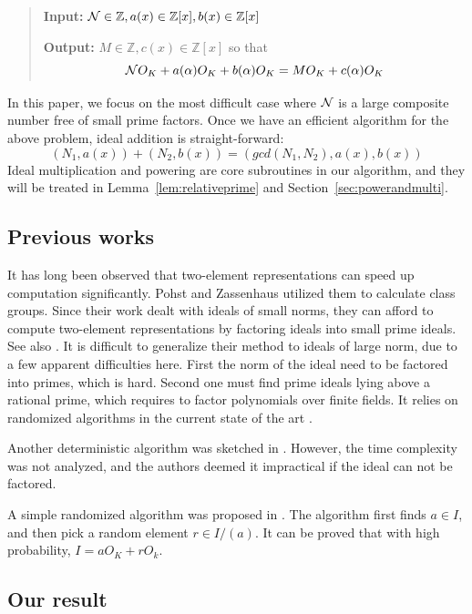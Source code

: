 \documentclass[runningheads, letter]{llncs}
\newcommand{\Z}{{\mathbb Z}}
\begin{document}
\begin{quote}
 {\bf Input:} \( {\cal N} \in \Z, a(x) \in \Z[x], b(x)  \in \Z[x]\)

 {\bf Output:} \( M \in \Z, c (x) \in \Z[x] \) so that
 \[ {\cal N} O_K + a (\alpha) O_K + b (\alpha) O_K
   = M O_K + c(\alpha) O_K  \]
\end{quote}

In this paper, we focus on the most difficult case
where \( {\cal N} \) 
is a large composite number free of small prime factors.
Once we have an efficient algorithm for the above problem,
ideal addition is straight-forward:
\[ (N_1, a(x)) + (N_2, b(x)) = ( gcd(N_1, N_2), a(x), b(x) )  \]
Ideal multiplication and powering are core subroutines in
our algorithm, and they will be treated in
Lemma~\ref{lem:relativeprime} and
Section~\ref{sec:powerandmulti}.
%

\subsection{Previous works}

It has long been observed that two-element representations
can speed up computation significantly.
Pohst and Zassenhaus \cite{PZ85} utilized them
to calculate class groups.
Since their work dealt with ideals of small norms,
they can afford to compute two-element representations
by factoring ideals into  small prime ideals.
See also \cite{GMN13}.
It is difficult to generalize their method to ideals of
large norm, due to a few apparent difficulties here.
First the norm of the ideal need to be factored into primes,
which is hard. Second one must find  prime ideals
lying above a rational prime, which  requires to factor
polynomials over finite fields. It relies on  randomized algorithms
in the current state of the art \cite{KedlayaUm11}.

Another deterministic algorithm was sketched
in \cite[Subsection 6.3.2]{Belabas04}.
However, the time complexity was not analyzed, and
the authors deemed it impractical if
the ideal can not be factored.

%
%
A simple randomized algorithm was proposed in
\cite{MMPT23,PS21,FS10}.
The algorithm first finds \( a\in I \),
and then pick a random element \( r \in I/(a) \).
%
It can be proved that with high probability,
\( I = a O_K + r O_k \).
%


\subsection{Our result}
\end{document}
